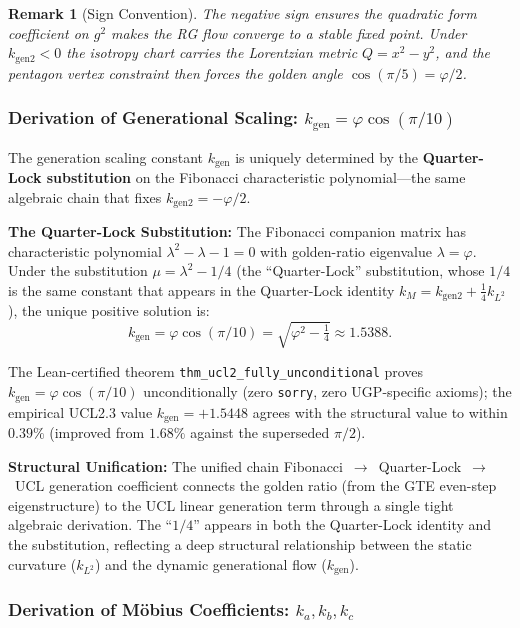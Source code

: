 \documentclass[11pt,twocolumn]{article}
\newtheorem{remark}{Remark}[section]
\begin{document}
\begin{remark}[Sign Convention]
The negative sign ensures the quadratic form coefficient on $g^2$ makes the RG flow converge to a stable fixed point. Under $k_{\text{gen2}} < 0$ the isotropy chart carries the Lorentzian metric $Q = x^2 - y^2$, and the pentagon vertex constraint then forces the golden angle $\cos(\pi/5) = \varphi/2$.
\end{remark}

\subsubsection{Derivation of Generational Scaling: $k_{\text{gen}} = \varphi\cos(\pi/10)$}

The generation scaling constant $k_{\text{gen}}$ is uniquely determined by the \textbf{Quarter-Lock substitution} on the Fibonacci characteristic polynomial---the same algebraic chain that fixes $k_{\text{gen2}} = -\varphi/2$.

\textbf{The Quarter-Lock Substitution:}
The Fibonacci companion matrix has characteristic polynomial $\lambda^2 - \lambda - 1 = 0$ with golden-ratio eigenvalue $\lambda = \varphi$.
Under the substitution $\mu = \lambda^2 - 1/4$ (the ``Quarter-Lock'' substitution, whose $1/4$ is the same constant that appears in the Quarter-Lock identity $k_M = k_{\text{gen2}} + \tfrac{1}{4}k_{L^2}$), the unique positive solution is:
\[
k_{\text{gen}} = \varphi\cos(\pi/10) = \sqrt{\varphi^2 - \tfrac{1}{4}} \approx 1.5388.
\]

The Lean-certified theorem \texttt{thm\_ucl2\_fully\_unconditional} proves $k_{\text{gen}} = \varphi\cos(\pi/10)$ unconditionally (zero \texttt{sorry}, zero UGP-specific axioms); the empirical UCL2.3 value $k_{\text{gen}} = +1.5448$ agrees with the structural value to within $0.39\%$ (improved from $1.68\%$ against the superseded $\pi/2$).

\textbf{Structural Unification:}
The unified chain Fibonacci~$\to$~Quarter-Lock~$\to$~UCL generation coefficient connects the golden ratio (from the GTE even-step eigenstructure) to the UCL linear generation term through a single tight algebraic derivation.
The ``$1/4$'' appears in both the Quarter-Lock identity and the substitution, reflecting a deep structural relationship between the static curvature ($k_{L^2}$) and the dynamic generational flow ($k_{\text{gen}}$).

\subsubsection{Derivation of Möbius Coefficients: $k_a, k_b, k_c$}
\end{document}
